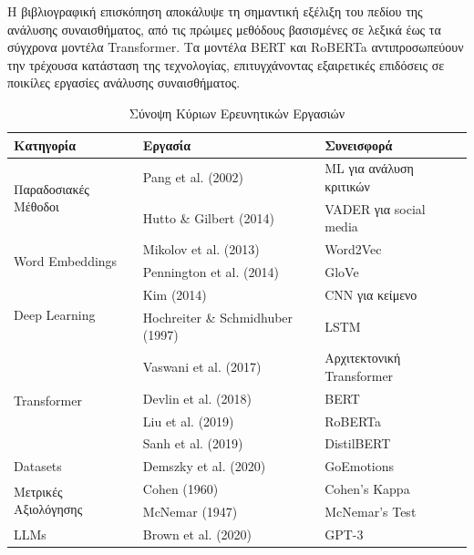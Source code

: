 \documentclass[a4paper,11pt,oneside,openany]{ioniothesis}
\begin{document}
Η βιβλιογραφική επισκόπηση αποκάλυψε τη σημαντική εξέλιξη του πεδίου της ανάλυσης συναισθήματος, από τις πρώιμες μεθόδους βασισμένες σε λεξικά έως τα σύγχρονα μοντέλα Transformer. Τα μοντέλα BERT και RoBERTa αντιπροσωπεύουν την τρέχουσα κατάσταση της τεχνολογίας, επιτυγχάνοντας εξαιρετικές επιδόσεις σε ποικίλες εργασίες ανάλυσης συναισθήματος.

\begin{table}[H]
\centering
\caption{Σύνοψη Κύριων Ερευνητικών Εργασιών}
\label{tab:literature_summary}
\begin{tabular}{@{}llp{5cm}@{}}
\toprule
\textbf{Κατηγορία} & \textbf{Εργασία} & \textbf{Συνεισφορά} \\
\midrule
\multirow{2}{*}{Παραδοσιακές Μέθοδοι} & Pang et al. (2002) & ML για ανάλυση κριτικών \\
& Hutto \& Gilbert (2014) & VADER για social media \\
\midrule
\multirow{2}{*}{Word Embeddings} & Mikolov et al. (2013) & Word2Vec \\
& Pennington et al. (2014) & GloVe \\
\midrule
\multirow{2}{*}{Deep Learning} & Kim (2014) & CNN για κείμενο \\
& Hochreiter \& Schmidhuber (1997) & LSTM \\
\midrule
\multirow{4}{*}{Transformer} & Vaswani et al. (2017) & Αρχιτεκτονική Transformer \\
& Devlin et al. (2018) & BERT \\
& Liu et al. (2019) & RoBERTa \\
& Sanh et al. (2019) & DistilBERT \\
\midrule
Datasets & Demszky et al. (2020) & GoEmotions \\
\midrule
\multirow{2}{*}{Μετρικές Αξιολόγησης} & Cohen (1960) & Cohen's Kappa \\
& McNemar (1947) & McNemar's Test \\
\midrule
LLMs & Brown et al. (2020) & GPT-3 \\
\bottomrule
\end{tabular}
\end{table}
















\newpage
\end{document}
